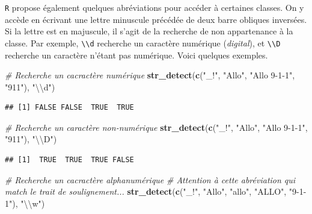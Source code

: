 \documentclass[
  11pt,
]{book}
\newenvironment{Shaded}{\begin{snugshade}}{\end{snugshade}}
\newcommand{\CharTok}[1]{\textcolor[rgb]{0.31,0.60,0.02}{#1}}
\newcommand{\CommentTok}[1]{\textcolor[rgb]{0.56,0.35,0.01}{\textit{#1}}}
\newcommand{\KeywordTok}[1]{\textcolor[rgb]{0.13,0.29,0.53}{\textbf{#1}}}
\newcommand{\NormalTok}[1]{#1}
\newcommand{\StringTok}[1]{\textcolor[rgb]{0.31,0.60,0.02}{#1}}
\numberwithin{equation}{section}
\numberwithin{countremarque}{section}
\begin{document}
\texttt{R} propose également quelques abréviations pour accéder à certaines classes. On y accède en écrivant une lettre minuscule précédée de deux barre obliques inversées. Si la lettre est en majuscule, il s'agit de la recherche de non appartenance à la classe. Par exemple, \texttt{\textbackslash{}\textbackslash{}d} recherche un caractère numérique (\emph{digital}), et \texttt{\textbackslash{}\textbackslash{}D} recherche un caractère n'étant pas numérique. Voici quelques exemples.

\begin{Shaded}
\begin{Highlighting}[]
\CommentTok{\# Recherche un cacractère numérique}
\KeywordTok{str\_detect}\NormalTok{(}\KeywordTok{c}\NormalTok{(}\StringTok{"\_!"}\NormalTok{, }\StringTok{"Allo"}\NormalTok{, }\StringTok{"Allo 9{-}1{-}1"}\NormalTok{, }\StringTok{"911"}\NormalTok{), }\StringTok{"}\CharTok{\textbackslash{}\textbackslash{}}\StringTok{d"}\NormalTok{)}
\end{Highlighting}
\end{Shaded}

\begin{lstlisting}
## [1] FALSE FALSE  TRUE  TRUE
\end{lstlisting}

\begin{Shaded}
\begin{Highlighting}[]
\CommentTok{\# Recherche un caractère non{-}numérique}
\KeywordTok{str\_detect}\NormalTok{(}\KeywordTok{c}\NormalTok{(}\StringTok{"\_!"}\NormalTok{, }\StringTok{"Allo"}\NormalTok{, }\StringTok{"Allo 9{-}1{-}1"}\NormalTok{, }\StringTok{"911"}\NormalTok{), }\StringTok{"}\CharTok{\textbackslash{}\textbackslash{}}\StringTok{D"}\NormalTok{)}
\end{Highlighting}
\end{Shaded}

\begin{lstlisting}
## [1]  TRUE  TRUE  TRUE FALSE
\end{lstlisting}

\begin{Shaded}
\begin{Highlighting}[]
\CommentTok{\# Recherche un cacractère alphanumérique}
\CommentTok{\# Attention à cette abréviation qui match le trait de soulignement...}
\KeywordTok{str\_detect}\NormalTok{(}\KeywordTok{c}\NormalTok{(}\StringTok{"\_!"}\NormalTok{, }\StringTok{"Allo"}\NormalTok{, }\StringTok{"allo"}\NormalTok{, }\StringTok{"ALLO"}\NormalTok{, }\StringTok{"9{-}1{-}1"}\NormalTok{), }\StringTok{"}\CharTok{\textbackslash{}\textbackslash{}}\StringTok{w"}\NormalTok{)}
\end{Highlighting}
\end{Shaded}
\end{document}
